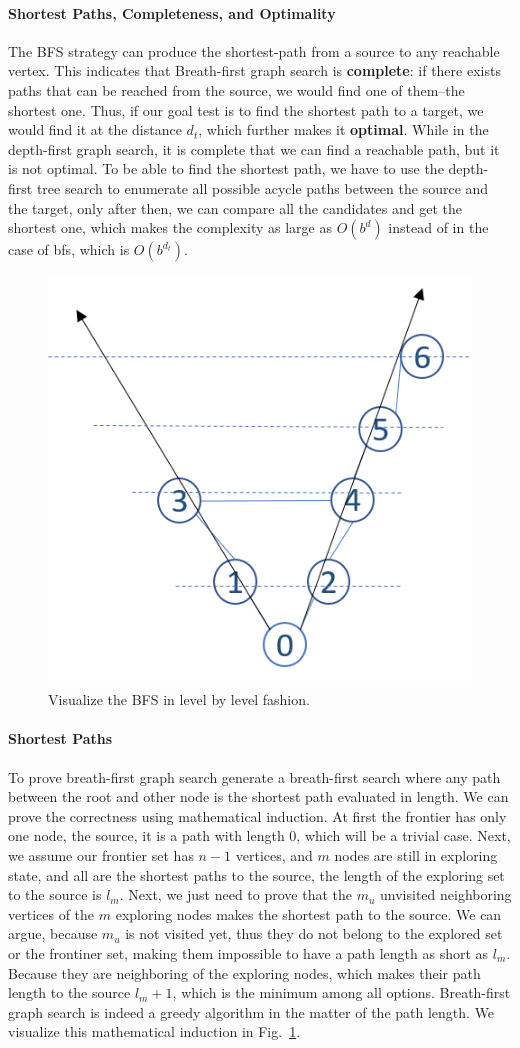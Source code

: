 \documentclass[main.tex]{subfiles}
\begin{document}
\paragraph{Shortest Paths, Completeness, and Optimality}  The BFS strategy can produce the shortest-path from a source to any reachable vertex. This indicates that Breath-first graph search is \textbf{complete}: if there exists paths that can be reached from the source, we would find one of them--the shortest one. Thus, if our goal test is to find the shortest path to a target, we would find it at the distance $d_t$, which further  makes it \textbf{optimal}. While in the depth-first graph search, it is complete that we can find a reachable path, but it is not optimal. To be able to find the shortest path, we have to use the depth-first tree search to enumerate all possible acycle paths between the source and the target, only after then, we can compare all the candidates and get the shortest one,  which makes the complexity as large as $O(b^d)$ instead of in the case of bfs, which is $O(b^{d_t})$. 
 \begin{figure}[!ht]
    \centering
    \includegraphics[width=0.3\columnwidth]{fig/bfs_shortest_dis.png}
    \caption{Visualize the BFS in level by level fashion.}
    \label{fig:bfs_search_shortest_path}
\end{figure}

\paragraph{Shortest Paths} To prove breath-first graph search generate a breath-first search where any  path between the root and other node is the shortest path evaluated in length. We can prove the correctness using mathematical induction. At first the frontier has only one node, the source, it is a path with length 0, which will be a trivial case. Next, we assume our frontier set has $n-1$ vertices, and $m$ nodes are still in exploring state, and all are the shortest paths to the source, the length of the exploring set to the source is $l_m$. Next, we just need to prove that the $m_u$ unvisited neighboring vertices of the $m$ exploring nodes makes the shortest path to the source. We can argue, because $m_u$ is not visited yet, thus they do not belong to the explored set or the frontiner set, making them impossible to have a path length as short as $l_m$. Because they are neighboring of the exploring nodes, which makes their path length to the source $l_m+1$, which is the minimum among all options. Breath-first graph search is indeed a greedy algorithm in the matter of the path length. We visualize this mathematical induction in Fig.~\ref{fig:bfs_search_shortest_path}. 
\end{document}

